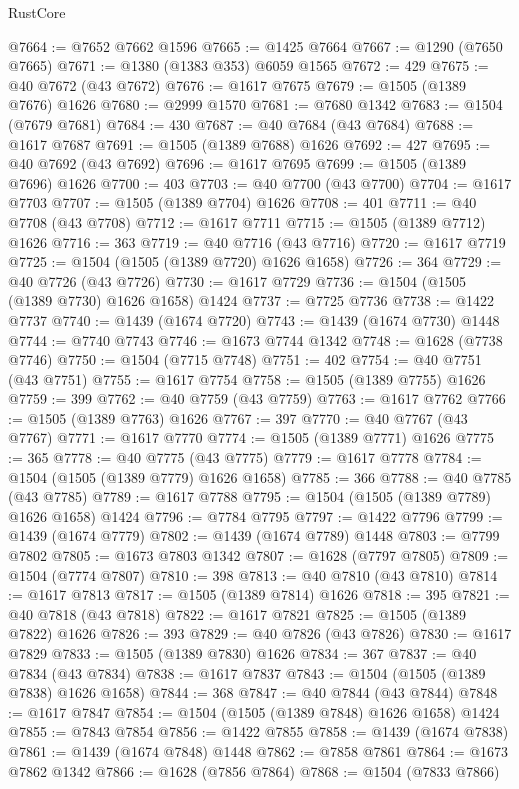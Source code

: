 \begin{lexlean}{RustCore}
\begin{coremodule}
@7664 := @7652 @7662 @1596
@7665 := @1425 @7664
@7667 := @1290 (@7650 @7665)
@7671 := @1380 (@1383 @353) @6059 @1565
@7672 := 429
@7675 := @40 @7672 (@43 @7672)
@7676 := @1617 @7675
@7679 := @1505 (@1389 @7676) @1626
@7680 := @2999 @1570
@7681 := @7680 @1342
@7683 := @1504 (@7679 @7681)
@7684 := 430
@7687 := @40 @7684 (@43 @7684)
@7688 := @1617 @7687
@7691 := @1505 (@1389 @7688) @1626
@7692 := 427
@7695 := @40 @7692 (@43 @7692)
@7696 := @1617 @7695
@7699 := @1505 (@1389 @7696) @1626
@7700 := 403
@7703 := @40 @7700 (@43 @7700)
@7704 := @1617 @7703
@7707 := @1505 (@1389 @7704) @1626
@7708 := 401
@7711 := @40 @7708 (@43 @7708)
@7712 := @1617 @7711
@7715 := @1505 (@1389 @7712) @1626
@7716 := 363
@7719 := @40 @7716 (@43 @7716)
@7720 := @1617 @7719
@7725 := @1504 (@1505 (@1389 @7720) @1626 @1658)
@7726 := 364
@7729 := @40 @7726 (@43 @7726)
@7730 := @1617 @7729
@7736 := @1504 (@1505 (@1389 @7730) @1626 @1658) @1424
@7737 := @7725 @7736
@7738 := @1422 @7737
@7740 := @1439 (@1674 @7720)
@7743 := @1439 (@1674 @7730) @1448
@7744 := @7740 @7743
@7746 := @1673 @7744 @1342
@7748 := @1628 (@7738 @7746)
@7750 := @1504 (@7715 @7748)
@7751 := 402
@7754 := @40 @7751 (@43 @7751)
@7755 := @1617 @7754
@7758 := @1505 (@1389 @7755) @1626
@7759 := 399
@7762 := @40 @7759 (@43 @7759)
@7763 := @1617 @7762
@7766 := @1505 (@1389 @7763) @1626
@7767 := 397
@7770 := @40 @7767 (@43 @7767)
@7771 := @1617 @7770
@7774 := @1505 (@1389 @7771) @1626
@7775 := 365
@7778 := @40 @7775 (@43 @7775)
@7779 := @1617 @7778
@7784 := @1504 (@1505 (@1389 @7779) @1626 @1658)
@7785 := 366
@7788 := @40 @7785 (@43 @7785)
@7789 := @1617 @7788
@7795 := @1504 (@1505 (@1389 @7789) @1626 @1658) @1424
@7796 := @7784 @7795
@7797 := @1422 @7796
@7799 := @1439 (@1674 @7779)
@7802 := @1439 (@1674 @7789) @1448
@7803 := @7799 @7802
@7805 := @1673 @7803 @1342
@7807 := @1628 (@7797 @7805)
@7809 := @1504 (@7774 @7807)
@7810 := 398
@7813 := @40 @7810 (@43 @7810)
@7814 := @1617 @7813
@7817 := @1505 (@1389 @7814) @1626
@7818 := 395
@7821 := @40 @7818 (@43 @7818)
@7822 := @1617 @7821
@7825 := @1505 (@1389 @7822) @1626
@7826 := 393
@7829 := @40 @7826 (@43 @7826)
@7830 := @1617 @7829
@7833 := @1505 (@1389 @7830) @1626
@7834 := 367
@7837 := @40 @7834 (@43 @7834)
@7838 := @1617 @7837
@7843 := @1504 (@1505 (@1389 @7838) @1626 @1658)
@7844 := 368
@7847 := @40 @7844 (@43 @7844)
@7848 := @1617 @7847
@7854 := @1504 (@1505 (@1389 @7848) @1626 @1658) @1424
@7855 := @7843 @7854
@7856 := @1422 @7855
@7858 := @1439 (@1674 @7838)
@7861 := @1439 (@1674 @7848) @1448
@7862 := @7858 @7861
@7864 := @1673 @7862 @1342
@7866 := @1628 (@7856 @7864)
@7868 := @1504 (@7833 @7866)

\end{coremodule}
\end{lexlean}
